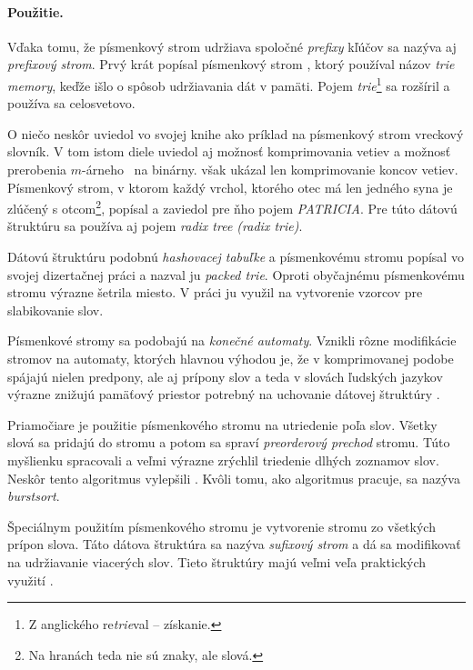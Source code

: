 \paragraph{Použitie.}
Vďaka tomu, že písmenkový strom udržiava spoločné \emph{prefixy} kľúčov sa 
nazýva aj \emph{prefixový strom}.
Prvý krát popísal písmenkový strom \citet{fredkin}, ktorý používal názov 
\emph{trie memory}, keďže išlo o spôsob udržiavania dát v pamäti. Pojem 
\emph{trie}\footnote{Z anglického re\emph{trie}val -- získanie.} 
sa rozšíril a používa sa celosvetovo.

O niečo neskôr \citet{knuth} uviedol vo svojej knihe ako príklad na 
písmenkový strom vreckový slovník. V tom istom diele uviedol aj možnosť 
komprimovania vetiev a možnosť prerobenia $m$-árneho \trie\ na binárny. 
\citet{knuth} však ukázal len komprimovanie koncov vetiev. Písmenkový 
strom, v ktorom každý vrchol, ktorého otec má len jedného syna 
je zlúčený s otcom\footnote{Na hranách teda nie sú znaky, ale slová.}, 
popísal \citet{patricia} a zaviedol pre ňho pojem \emph{PATRICIA}. 
Pre túto dátovú štruktúru sa používa aj pojem \emph{radix tree (radix trie)}. 

Dátovú štruktúru podobnú \emph{hashovacej tabuľke} a písmenkovému stromu 
popísal vo svojej dizertačnej práci \citet{liang} a nazval ju \emph{packed 
trie}. Oproti obyčajnému písmenkovému stromu výrazne šetrila miesto. 
V práci ju využil na vytvorenie vzorcov pre slabikovanie slov.

Písmenkové stromy sa podobajú na \emph{konečné automaty}. 
Vznikli rôzne modifikácie stromov na automaty, ktorých hlavnou výhodou je, 
že v komprimovanej podobe spájajú nielen predpony, ale aj prípony slov 
a teda v slovách ľudských jazykov výrazne znižujú pamäťový priestor potrebný 
na uchovanie dátovej štruktúry \citep{scrabble,ca}. 

Priamočiare je použitie písmenkového stromu na utriedenie poľa slov. 
Všetky slová sa pridajú do stromu a potom sa spraví \emph{preorderový prechod} 
stromu. Túto myšlienku spracovali \citet{burstsort1} a veľmi výrazne zrýchlil 
triedenie dlhých zoznamov slov. Neskôr tento algoritmus vylepšili 
\citet{burstsort2}. Kvôli tomu, ako algoritmus pracuje, 
sa nazýva \emph{burstsort}.

Špeciálnym použitím písmenkového stromu je vytvorenie stromu zo všetkých 
prípon slova. Táto dátova štruktúra sa nazýva \emph{sufixový strom} a dá sa 
mo\-di\-fi\-ko\-vať na udržiavanie viacerých slov. Tieto štruktúry majú 
veľmi veľa praktických využití \citep{gusfield}. 


